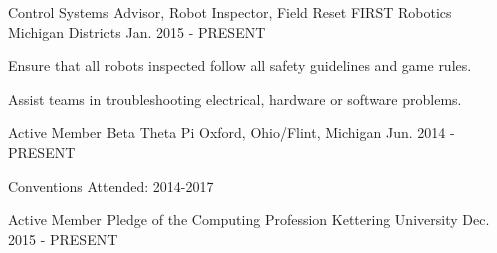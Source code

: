 

\begin{cventries}

  \cventry
    {Control Systems Advisor, Robot Inspector, Field Reset} %
    {FIRST Robotics} %
    {Michigan Districts} %
    {Jan. 2015 - PRESENT} %
    {
      \begin{cvitems} %
        \item {Ensure that all robots inspected follow all safety guidelines and game rules.}
        \item {Assist teams in troubleshooting electrical, hardware or software problems.}
      \end{cvitems}
    }

  \cventry
    {Active Member} %
    {Beta Theta Pi} %
    {Oxford, Ohio/Flint, Michigan} %
    {Jun. 2014 - PRESENT} %
    {
      \begin{cvitems} %
        \item {Conventions Attended: 2014-2017}
      \end{cvitems}
    }

  \cventry
    {Active Member} %
    {Pledge of the Computing Profession} %
    {Kettering University} %
    {Dec. 2015 - PRESENT} %
    {
      \begin{cvitems} %
      \end{cvitems}
    }


\end{cventries}
